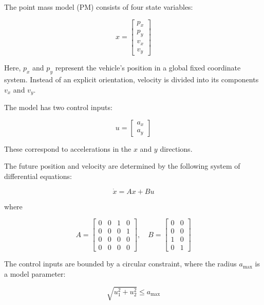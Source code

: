 The point mass model (PM) consists of four state variables:

\begin{equation}
	x = \begin{bmatrix} p_x \\ p_y \\ v_x \\ v_y \end{bmatrix}
	\label{eq:states_pm}
\end{equation}

Here, $p_x$ and $p_y$ represent the vehicle's position in a global fixed coordinate system.
Instead of an explicit orientation, velocity is divided into its components $v_x$ and $v_y$.

The model has two control inputs:

\begin{equation}
	u = \begin{bmatrix} a_x \\ a_y \end{bmatrix}
	\label{eq:controls_pm}
\end{equation}

These correspond to accelerations in the $x$ and $y$ directions.

The future position and velocity are determined by the following system of differential equations:

\begin{equation}
	\dot{x} = A x + B u
\end{equation}

where

\begin{equation}
	A = \begin{bmatrix} 0 & 0 & 1 & 0 \\ 0 & 0 & 0 & 1 \\ 0 & 0 & 0 & 0 \\ 0 & 0 & 0 & 0 \end{bmatrix}, \quad
	B = \begin{bmatrix} 0 & 0 \\ 0 & 0 \\ 1 & 0 \\ 0 & 1 \end{bmatrix}
\end{equation}

The control inputs are bounded by a circular constraint, where the radius $a_{\max}$ is a model parameter:

\begin{equation}
	\sqrt{u_1^2 + u_2^2} \leq a_{\max}
\end{equation}

